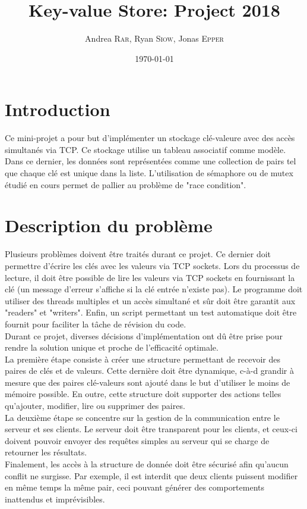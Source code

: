 \documentclass[11pt,a4paper]{article}
\title{\vspace{-10em}Key-value Store: Project 2018}
\date{\today}
\author{Andrea \textsc{Rar}, Ryan \textsc{Siow}, Jonas \textsc{Epper}}
\newcommand{\emailurl}[1]{\href{mailto:#1}{#1}}
\renewcommand\maketitle{
\begin{center}%
    {\LARGE \thetitle \vspace \baselineskip \par}%
    {\large \theauthor \vspace \baselineskip \par}%
\myaddress
\emailurl{\myemail}
\end{center}
}
\begin{document}
\maketitle
\thispagestyle{empty}

\renewcommand{\contentsname}{\large Table des matières}
\renewcommand{\baselinestretch}{0.75}\normalsize
\tableofcontents %
\newpage
\section{Introduction}
Ce mini-projet a pour but d'implémenter un stockage clé-valeure avec des accès simultanés via TCP. Ce stockage utilise un tableau associatif comme modèle. Dans ce dernier, les données sont représentées comme une collection de pairs tel que chaque clé est unique dans la liste. L'utilisation de sémaphore ou de mutex étudié en cours permet de pallier au problème de "race condition". 

\section{Description du problème}
Plusieurs problèmes doivent être traités durant ce projet. Ce dernier doit permettre d'écrire les clés avec les valeurs via TCP sockets. Lors du processus de lecture, il doit être possible de lire les valeurs via TCP sockets en fournissant la clé (un message d'erreur s'affiche si la clé entrée n'existe pas). Le programme doit utiliser des threads multiples et un accès simultané et sûr doit être garantit aux "readers" et "writers". Enfin, un script permettant un test automatique doit être fournit pour faciliter la tâche de révision du code.\\
Durant ce projet, diverses décisions d'implémentation ont dû être prise pour rendre la solution unique et proche de l'efficacité optimale.\\
La première étape consiste à créer une structure permettant de recevoir des paires de clés et de valeurs. Cette dernière doit être dynamique, c-à-d grandir à mesure que des paires clé-valeurs sont ajouté dans le but d'utiliser le moins de mémoire possible. En outre, cette structure doit supporter des actions telles qu'ajouter, modifier, lire ou supprimer des paires.\\
La deuxième étape se concentre sur la gestion de la communication entre le serveur et ses clients. Le serveur doit être transparent pour les clients, et ceux-ci doivent pouvoir envoyer des requêtes simples au serveur qui se charge de retourner les résultats.\\
Finalement, les accès à la structure de donnée doit être sécurisé afin qu'aucun conflit ne surgisse. Par exemple, il est interdit que deux clients puissent modifier en même temps la même pair, ceci pouvant générer des comportements inattendus et imprévisibles.\\
\end{document}
